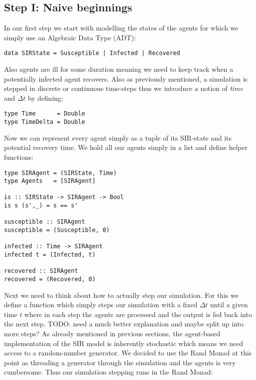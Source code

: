 \subsection{Step I: Naive beginnings}
In our first step we start with modelling the states of the agents for which we simply use an Algebraic Data Type (ADT):

\begin{verbatim}
data SIRState = Susceptible | Infected | Recovered
\end{verbatim}

Also agents are ill for some duration meaning we need to keep track when a potentially infected agent recovers. Also as previously mentioned, a simulation is stepped in discrete or continuous time-steps thus we introduce a notion of \textit{time} and $\Delta t$ by defining:

\begin{verbatim}
type Time      = Double
type TimeDelta = Double
\end{verbatim}

Now we can represent every agent simply as a tuple of its SIR-state and its potential recovery time. We hold all our agents simply in a list and define helper functions:
\begin{verbatim}
type SIRAgent = (SIRState, Time)
type Agents   = [SIRAgent]

is :: SIRState -> SIRAgent -> Bool
is s (s',_) = s == s'

susceptible :: SIRAgent
susceptible = (Susceptible, 0)

infected :: Time -> SIRAgent
infected t = (Infected, t)

recovered :: SIRAgent
recovered = (Recovered, 0)
\end{verbatim}

Next we need to think about how to actually step our simulation. For this we define a function which simply steps our simulation with a fixed $\Delta t$ until a given time $t$ where in each step the agents are processed and the output is fed back into the next step.
TODO: need a much better explanation and maybe split up into more steps?
As already mentioned in previous sections, the agent-based implementation of the SIR model is inherently stochastic which means we need access to a random-number generator. We decided to use the Rand Monad at this point as threading a generator through the simulation and the agents is very cumbersome. Thus our simulation stepping runs in the Rand Monad:

